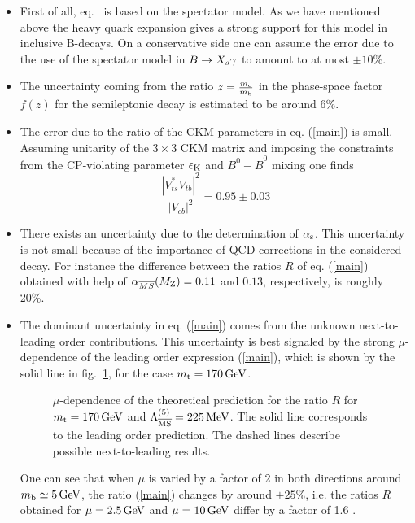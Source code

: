 \begin{itemize}
\item
First of all, eq.\  is based on the spectator model. As we
have mentioned above the heavy quark expansion gives a strong support
for this model in inclusive B-decays.  On a conservative side one can
assume the error due to the use of the spectator model in $B \to X_s \gamma$ to
amount to at most $\pm 10\%$.
\item
The uncertainty coming from the ratio $z = \frac{m_{\rm c}}{m_{\rm b}}$ in the
phase-space factor $f(z)$ for the semileptonic decay is estimated to be
around 6\%.
\item
The error due to the ratio of the CKM parameters in
eq. (\ref{main}) is small. Assuming unitarity of the $3 \times 3$ CKM
matrix and imposing the constraints from the CP-violating parameter
$\epsilon_{\rm K}$ and $B^0-\bar B^0$ mixing one finds
\begin{equation}\label{KM}
\frac{|V_{ts}^* V_{tb}^{}|^2}{|V_{cb}|^2} = 0.95 \pm 0.03     
\end{equation}
\item
There exists an uncertainty due to the determination of $\alpha_{\rm s}$. This
uncertainty is not small because of the importance of QCD corrections
in the considered decay.  For instance the difference between the
ratios $R$ of eq.  (\ref{main}) obtained with help of
$\alpha_{\overline{MS}}(M_{\rm Z})=0.11$ and $0.13$, respectively, is roughly
20\%.
\item
The dominant uncertainty in eq. (\ref{main}) comes from the
unknown next-to-leading order contributions. This uncertainty is best
signaled by the strong $\mu$-dependence of the leading order
expression (\ref{main}), which is shown by the solid line in
fig.\ \ref{fig:bsg:rmu}, for the case $m_{\rm t}=170\, {\rm GeV}$. 

\begin{figure}[hbt]
\vspace{0.10in}
\centerline{
\epsfysize=5in
}
\vspace{0.08in}
\caption[]{
$\mu$-dependence of the theoretical prediction for the ratio $R$ for
$m_{\rm t}=170\, {\rm GeV}$ and $\Lambda_{\overline{\rm MS}}^{(5)}=225\, {\rm MeV}$. The solid line corresponds to the
leading order prediction. The dashed lines describe possible
next-to-leading results.
\label{fig:bsg:rmu}}
\end{figure}

One can see that when $\mu$ is varied by a factor of 2 in both
directions around $m_{\rm b} \simeq 5\, {\rm GeV}$, the ratio (\ref{main}) changes
by around $\pm 25\%$, i.e. the ratios $R$ obtained for $\mu=2.5\, {\rm GeV}$
and $\mu=10\, {\rm GeV}$ differ by a factor of 1.6 \cite{aligreub:93}. 


\end{itemize}
